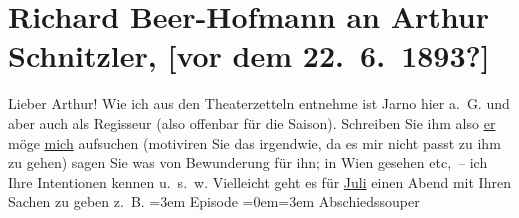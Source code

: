 

         
         \renewcommand{\erwaehntePersonen}{Personen: Benedikt Felix, Josef Jarno}
         \renewcommand{\erwaehnteOrte}{Orte: Bad Ischl, Wien}
         \renewcommand{\erwaehnteWerke}{Werke: Abschiedssouper, Anatols Hochzeitsmorgen, Episode, Signor Formica. Komische Oper in drei Akten}
               \section[Richard Beer-Hofmann an Arthur Schnitzler, {[}vor dem 22. 6. 1893?{]}]{ Richard Beer-Hofmann an Arthur Schnitzler, {[}vor dem
               22. 6. 1893?{]}}\nopagebreak{}\rehead{ }\begin{ledgroupsized}[t]{13cm}\normalsize\beginnumbering \toendnotes[C]{\smallbreak\pagebreak[2]} 
\toendnotes[C]{\smallbreak}\pstart
           \noindent{}\textcolor{gray}{\textbf{\label{T_L00223-1v}\label{T_L00223-1h}}}\pend
           \pstart{}{\pb}Lieber Arthur!\pend\pstart
           Wie ich aus den Theaterzetteln entnehme ist Jarno hier a. G. und aber auch als Regisseur (also offenbar für die Saison).
               Schreiben Sie ihm also \uline{er} möge \uline{mich} aufsuchen (motiviren Sie das irgendwie, da es mir nicht passt zu
               ihm zu gehen) sagen {\pb}Sie was von
               Bewunderung für ihn; in Wien gesehen etc, – ich
               Ihre Intentionen kennen u. s. w. Vielleicht geht es für \uline{Juli} einen Abend mit Ihren Sachen zu geben z. B.\pend
           \leftskip=3em{}\pstart
           \noindent{}Episode\pend
           \leftskip=0em{}\leftskip=3em{}\pstart
           Abschiedssouper\pend

\end{ledgroupsized}
